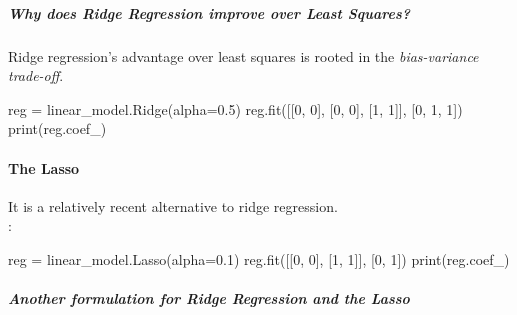 \subparagraph{Why does Ridge Regression improve over Least Squares?}
Ridge regression's advantage over least squares is rooted in the 
\emph{bias-variance trade-off}. 

\begin{python}
reg = linear_model.Ridge(alpha=0.5)
reg.fit([[0, 0], [0, 0], [1, 1]], [0, 1, 1])
print(reg.coef_)
\end{python}
\paragraph{The Lasso}
It is a relatively recent alternative to ridge regression.\\
:
\begin{center}
\end{center}
\begin{python}
reg = linear_model.Lasso(alpha=0.1)
reg.fit([[0, 0], [1, 1]], [0, 1])
print(reg.coef_)
\end{python}

\subparagraph{Another formulation for Ridge Regression and the Lasso}
\begin{center}
\end{center}

